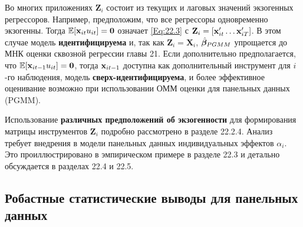 Во многих приложениях $\mathbf Z_i$ состоит из текущих и лаговых значений экзогенных регрессоров. Например, предположим, что все регрессоры одновременно экзогенны. Тогда $\mathbb{E}[\mathbf{x}_{it} u_{it}]= \mathbf 0$ означает \ref{Eq:22.3} с $\mathbf Z_i=[\mathbf{x}'_{it} \dots \mathbf{x}'_{iT}]$. В этом случае модель \textbf{идентифицируема} и, так как $\mathbf Z_i=\mathbf X_i$, $\hat{\bm{\beta}}_{PGMM}$ упрощается до МНК оценки сквозной регрессии главы 21. Если дополнительно предполагается, что $\mathbb{E}[\mathbf{x}_{it-1}u_{it}]=\mathbf 0$, тогда $\mathbf{x}_{it-1}$ доступна как дополнительный инструмент для $i$-го наблюдения, модель \textbf{сверх-идентифицируема}, и более эффективное оценивание возможно при использовании ОММ оценки для панельных данных (PGMM).

Использование \textbf{различных предположений об экзогенности} для формирования матрицы инструментов $\mathbf Z_i$  подробно рассмотрено в разделе 22.2.4. Анализ требует внедрения в модели панельных данных индивидуальных эффектов $\alpha_i$. Это проиллюстрировано в эмпирическом примере в разделе 22.3 и детально обсуждается в разделах 22.4 и 22.5.

\subsection{Робастные статистические выводы для панельных данных }

